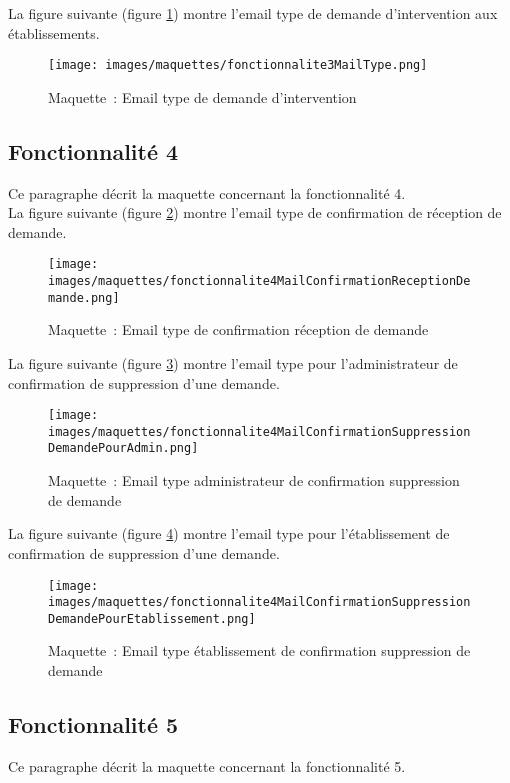 La figure suivante (figure \ref{maquette3-2}) montre l'email type de demande d'intervention aux établissements.
\begin{figure}[H]
	\centering
	\texttt{[image: images/maquettes/fonctionnalite3MailType.png]}
	\caption{Maquette~: Email type de demande d'intervention}
	\label{maquette3-2}
\end{figure}

\subsection{Fonctionnalité 4}
Ce paragraphe décrit la maquette concernant la fonctionnalité 4. \\

La figure suivante (figure \ref{maquette4-1}) montre l'email type de confirmation de réception de demande.
\begin{figure}[H]
	\centering
	\texttt{[image: images/maquettes/fonctionnalite4MailConfirmationReceptionDemande.png]}
	\caption{Maquette~: Email type de confirmation réception de demande}
	\label{maquette4-1}
\end{figure}

La figure suivante (figure \ref{maquette4-2}) montre l'email type pour l'administrateur de confirmation de suppression d'une demande.
\begin{figure}[H]
	\centering
	\texttt{[image: images/maquettes/fonctionnalite4MailConfirmationSuppressionDemandePourAdmin.png]}
	\caption{Maquette~: Email type administrateur de confirmation suppression de demande}
	\label{maquette4-2}
\end{figure}

La figure suivante (figure \ref{maquette4-3}) montre l'email type pour l'établissement de confirmation de suppression d'une demande.
\begin{figure}[H]
	\centering
	\texttt{[image: images/maquettes/fonctionnalite4MailConfirmationSuppressionDemandePourEtablissement.png]}
	\caption{Maquette~: Email type établissement de confirmation suppression de demande}
	\label{maquette4-3}
\end{figure}

\subsection{Fonctionnalité 5}
Ce paragraphe décrit la maquette concernant la fonctionnalité 5. \\

